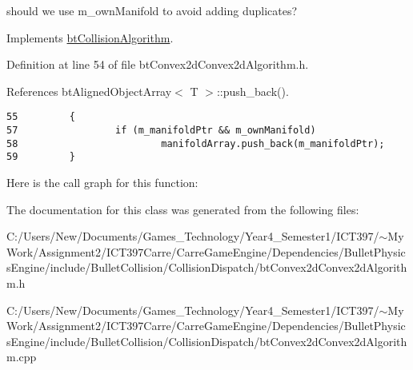 should we use m\_\-ownManifold to avoid adding duplicates? 

Implements \hyperlink{classbt_collision_algorithm}{btCollisionAlgorithm}.

Definition at line 54 of file btConvex2dConvex2dAlgorithm.h.

References btAlignedObjectArray$<$ T $>$::push\_\-back().

\begin{Code}\begin{verbatim}55         {
57                 if (m_manifoldPtr && m_ownManifold)
58                         manifoldArray.push_back(m_manifoldPtr);
59         }
\end{verbatim}
\end{Code}




Here is the call graph for this function:

The documentation for this class was generated from the following files:\begin{CompactItemize}
\item 
C:/Users/New/Documents/Games\_\-Technology/Year4\_\-Semester1/ICT397/$\sim$My Work/Assignment2/ICT397Carre/CarreGameEngine/Dependencies/BulletPhysicsEngine/include/BulletCollision/CollisionDispatch/btConvex2dConvex2dAlgorithm.h\item 
C:/Users/New/Documents/Games\_\-Technology/Year4\_\-Semester1/ICT397/$\sim$My Work/Assignment2/ICT397Carre/CarreGameEngine/Dependencies/BulletPhysicsEngine/include/BulletCollision/CollisionDispatch/btConvex2dConvex2dAlgorithm.cpp\end{CompactItemize}
